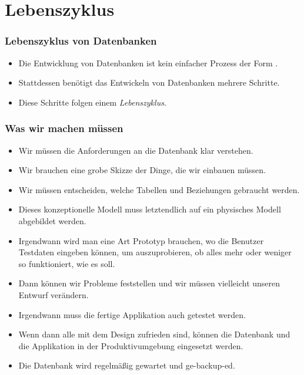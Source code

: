 \documentclass[aspectratio=169,mathserif,notheorems]{beamer}%
\begin{document}
\section{Lebenszyklus}%
%
\begin{frame}%
\frametitle{Lebenszyklus von Datenbanken}%
\begin{itemize}%
%
\item Die Entwicklung von Datenbanken ist kein einfacher Prozess der Form .%
%
\item<2-> Stattdessen benötigt das Entwickeln von Datenbanken mehrere Schritte.%
%
\item<3-> Diese Schritte folgen einem \emph{Lebenszyklus}.%
%
\end{itemize}%
\end{frame}%
%
\begin{frame}%
\frametitle{Was wir machen müssen}%
\begin{itemize}%
\item Wir müssen die Anforderungen an die Datenbank klar verstehen.%
%
\item<2-> Wir brauchen eine grobe Skizze der Dinge, die wir einbauen müssen.%
%
\item<3-> Wir müssen entscheiden, welche Tabellen und Beziehungen gebraucht werden.%
%
\item<4-> Dieses konzeptionelle Modell muss letztendlich auf ein physisches Modell abgebildet werden.%
%
\item<5-> Irgendwann wird man eine Art Prototyp brauchen, wo die Benutzer Testdaten eingeben können, um auszuprobieren, ob alles mehr oder weniger so funktioniert, wie es soll.%
%
\item<6-> Dann können wir Probleme feststellen und wir müssen vielleicht unseren Entwurf verändern.%
%
\item<7-> Irgendwann muss die fertige Applikation auch getestet werden.%
%
\item<8-> Wenn dann alle mit dem Design zufrieden sind, können die Datenbank und die Applikation in der Produktivumgebung eingesetzt werden.%
%
\item<9-> Die Datenbank wird regelmäßig gewartet und ge-backup-ed.%
\end{itemize}%
\end{frame}%
%
\end{document}
